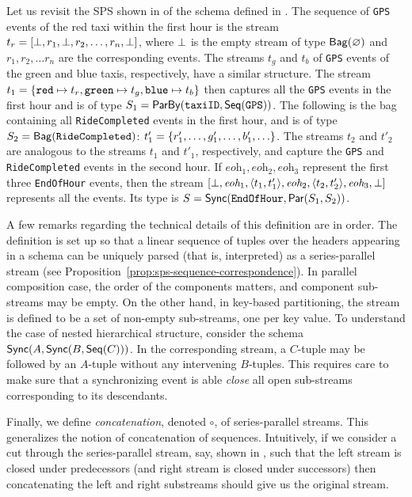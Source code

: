\newcommand{\eohevent}{\textit{eoh}}
\begin{example}
\label{ex:text-sps}
Let us revisit the SPS shown in  of the schema defined in .
The sequence of \texttt{GPS} events of the red taxi within the first hour is
the stream $t_r=[\bot,r_1,\bot,r_2,\ldots, r_n,\bot]$, where $\bot$ is the empty stream of type
$\mathsf{Bag}({\varnothing})$
and $r_1, r_2, \ldots r_n$ are the corresponding events.
The streams $t_g$ and $t_b$ of \texttt{GPS} events of the green and blue taxis, respectively, have a similar structure.
The stream $t_1 = \{{\texttt{red}}\mapsto{t_r},{\texttt{green}}\mapsto{t_g},{\texttt{blue}}\mapsto{t_b} \}$ then captures all the \texttt{GPS} events in the first hour and is of type
$S_1 = \mathsf{ParBy}({\texttt{taxiID}}, \mathsf{Seq}({\texttt{GPS}}))$.
The following is the bag containing
all \texttt{RideCompleted} events in the first hour,
and is of type $S_2 = \mathsf{Bag}({\texttt{RideCompleted}})$:
$t'_1=\{r'_1,\ldots,g'_1,\ldots,b'_1,\ldots\}$.
The streams $t_2$ and $t'_2$ are analogous to the streams $t_1$ and $t'_1$, respectively,
and capture the \texttt{GPS}  and \texttt{RideCompleted} events in the second hour.
If $\eohevent_1, \eohevent_2, \eohevent_3$ represent the first three \texttt{EndOfHour} events,
then the stream
$[\spsemp,\eohevent_1,\spspar{t_1}{t'_1},\eohevent_2,\spspar{t_2}{t'_2},\eohevent_3,\spsemp]$
represents all the events.
Its type is $S = \mathsf{Sync}({\texttt{EndOfHour}}, \mathsf{Par}({S_1}, {S_2}))$.
\end{example}

A few remarks regarding the technical details of this definition are in order.
The definition is set up so that a linear sequence of tuples over the headers
appearing in a schema can be uniquely parsed (that is, interpreted) as a series-parallel
stream (see Proposition~\ref{prop:sps-sequence-correspondence}). In parallel composition case, the order of the components matters, and component sub-streams may be empty. On the other hand, in key-based
partitioning, the stream is defined to be a set of non-empty sub-streams, one per key value.
To understand the case of nested hierarchical structure, consider the schema
$\mathsf{Sync}({A}, \mathsf{Sync}({B}, \mathsf{Seq}({C})))$. In the corresponding stream,
a $C$-tuple may be followed by an $A$-tuple without any intervening $B$-tuples.
This requires care to make sure that a synchronizing event is able {\em close}
all open sub-streams corresponding to its descendants.

Finally, we define {\em concatenation}, denoted $\circ$, of series-parallel streams.
This generalizes the notion of concatenation of sequences.
Intuitively, if we consider a cut through the series-parallel stream, say, shown in , such that the left stream is closed under predecessors (and right stream
is closed under successors) then concatenating the left and right substreams should give us the
original stream.

